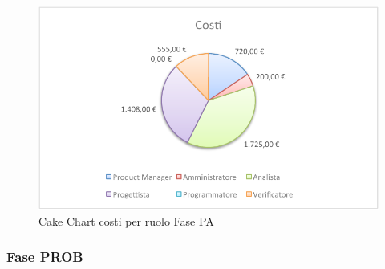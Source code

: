 				\begin{figure}[H]\centering
					\includegraphics[width=\textwidth]{PianoDiProgetto/Pics/ChartTotCostiFasePA.pdf}
					\caption{Cake Chart costi per ruolo Fase PA}
				\end{figure}
		\subsubsection{Fase PROB}
